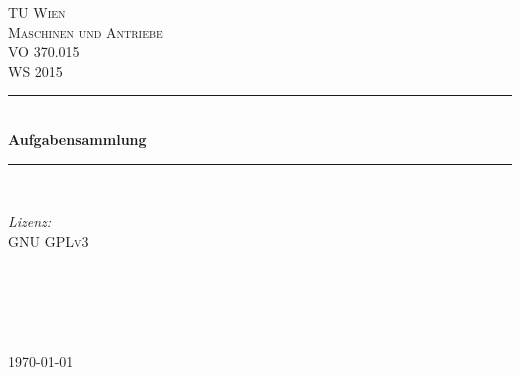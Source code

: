 \documentclass[12pt]{article} %
\numberwithin{equation}{subsection}
\begin{document}
	
	\begin{titlepage}
		
		\newcommand{\HRule}{\rule{\linewidth}{0.5mm}} %
		
		\center %
		
		\textsc{\LARGE TU Wien}\\[1.5cm] %
		\textsc{\Large Maschinen und Antriebe}\\[0.5cm] %
		\textsc{\large VO 370.015 \\ WS 2015}\\[0.5cm] %
		
		\HRule \\[0.4cm]
		{ \huge \bfseries Aufgabensammlung}\\[0.4cm] %
		\HRule \\[1.5cm]
		
		\begin{minipage}{0.4\textwidth}
			\begin{flushleft} \large
				\emph{Lizenz:}\\
				GNU \textsc{GPLv3} %
			\end{flushleft}
		\end{minipage}
		~
		\begin{minipage}{0.4\textwidth}
			\begin{flushright} \large
				\emph{} \\
				\textsc{} %
			\end{flushright}
		\end{minipage}\\[4cm]
		
		{\large \today}\\[3cm] %
		
		
		\vfill %
		
	\end{titlepage}
	
\end{document}

